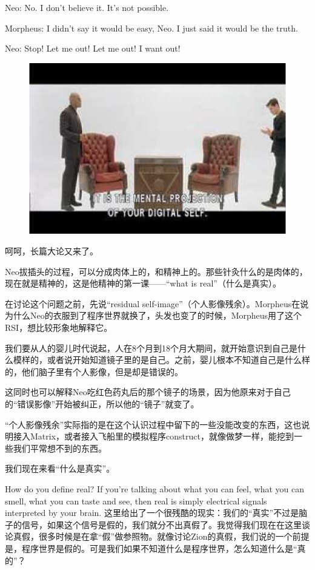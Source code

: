 \documentclass{ctexart}
\newenvironment{myquote}{\color{green} \setlength{\leftskip}{6em} \setlength{\rightskip}{4em} \setlength{\parindent}{-2em}}{\par}
\begin{document}
\begin{myquote}
Neo: No. I don't believe it. It's not possible.

Morpheus: I didn't say it would be easy, Neo. I just said it would be the truth.

Neo: Stop! Let me out! Let me out! I want out!
\end{myquote}

\begin{figure}[htb]
\centering
\includegraphics[width=0.5\linewidth]{fig/read_Matrix-29}
\end{figure}

呵呵，长篇大论又来了。

Neo拔插头的过程，可以分成肉体上的，和精神上的。那些针灸什么的是肉体的，现在就是精神的，这是他精神的第一课——“what is real”（什么是真实）。

在讨论这个问题之前，先说“residual self-image”（个人影像残余）。Morpheus在说为什么Neo的衣服到了程序世界就换了，头发也变了的时候，Morpheus用了这个RSI，想比较形象地解释它。

我们要从人的婴儿时代说起，人在8个月到18个月大期间，就开始意识到自己是什么模样的，或者说开始知道镜子里的是自己。之前，婴儿根本不知道自己是什么样的，他们脑子里有个人影像，但是却是错误的。

这同时也可以解释Neo吃红色药丸后的那个镜子的场景，因为他原来对于自己的“错误影像”开始被纠正，所以他的“镜子”就变了。

“个人影像残余”实际指的是在这个认识过程中留下的一些没能改变的东西，这也说明接入Matrix，或者接入飞船里的模拟程序construct，就像做梦一样，能挖到一些我们平常想不到的东西。

我们现在来看“什么是真实”。

How do you define real? If you're talking about what you can feel, what you can smell, what you can taste and see, then real is simply electrical signals interpreted by your brain. 这里给出了一个很残酷的现实：我们的“真实”不过是脑子的信号，如果这个信号是假的，我们就分不出真假了。我觉得我们现在在这里谈论真假，很多时候是在拿“假”做参照物。就像讨论Zion的真假，我们说的一个前提是，程序世界是假的。可是我们如果不知道什么是程序世界，怎么知道什么是“真的”？
\end{document}
